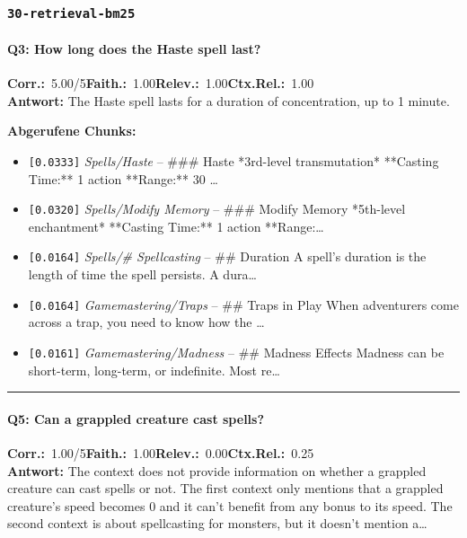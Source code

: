 \subsubsection*{\texttt{30-retrieval-bm25}}
\label{app:samples:30_retrieval_bm25}

\paragraph{Q3: How long does the Haste spell last?}
\noindent \textbf{Corr.:}~5.00/5\quad \textbf{Faith.:}~1.00\quad \textbf{Relev.:}~1.00\quad \textbf{Ctx.Rel.:}~1.00\\

\noindent\textbf{Antwort:} The Haste spell lasts for a duration of concentration, up to 1 minute.

\noindent\textbf{Abgerufene Chunks:}
\begin{itemize}[noitemsep, topsep=2pt]
  \item[\textbf{\#1}] \texttt{[0.0333]} \textit{Spells/Haste} -- \#\#\# Haste  *3rd-level transmutation*  **Casting Time:** 1 action  **Range:** 30 \ldots
  \item[\textbf{\#2}] \texttt{[0.0320]} \textit{Spells/Modify Memory} -- \#\#\# Modify Memory  *5th-level enchantment*  **Casting Time:** 1 action  **Range:\ldots
  \item[\textbf{\#3}] \texttt{[0.0164]} \textit{Spells/# Spellcasting} -- \#\# Duration  A spell's duration is the length of time the spell persists. A dura\ldots
  \item[\textbf{\#4}] \texttt{[0.0164]} \textit{Gamemastering/Traps} -- \#\# Traps in Play  When adventurers come across a trap, you need to know how the \ldots
  \item[\textbf{\#5}] \texttt{[0.0161]} \textit{Gamemastering/Madness} -- \#\# Madness Effects  Madness can be short-term, long-term, or indefinite. Most re\ldots
\end{itemize}
\vspace{4pt}
\hrule
\vspace{6pt}

\paragraph{Q5: Can a grappled creature cast spells?}
\noindent \textbf{Corr.:}~1.00/5\quad \textbf{Faith.:}~1.00\quad \textbf{Relev.:}~0.00\quad \textbf{Ctx.Rel.:}~0.25\\

\noindent\textbf{Antwort:} The context does not provide information on whether a grappled creature can cast spells or not. The first context only mentions that a grappled creature's speed becomes 0 and it can't benefit from any bonus to its speed. The second context is about spellcasting for monsters, but it doesn't mention a\ldots

